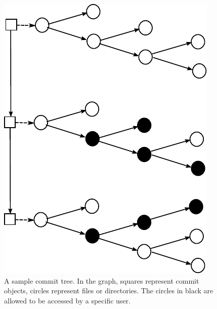\begin{figure}[t]
\centerline{\includegraphics{fig/committree.pdf}}
\caption{A sample commit tree. In the graph, squares represent commit objects,
circles represent files or directories. The circles in black are allowed to
be accessed by a specific user. }
\label{f:commit-tree}
\end{figure}

\endinput


